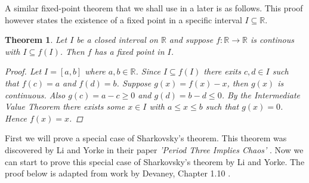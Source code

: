 \documentclass[11pt,a4paper,oneside]{memoir}
\theoremstyle{plain}
\newtheorem{thm}{Theorem}[chapter]
\theoremstyle{definition}
\begin{document}
A similar fixed-point theorem that we shall use in a later is as follows. This proof however states the existence of a fixed point in a specific interval $I \subseteq \mathbb{R}$.

\begin{thm} \label{thm:interval-fixed-points}
    Let $I$ be a closed interval on $\mathbb{R}$ and suppose $f: \mathbb{R} \to \mathbb{R}$ is continous with $I \subseteq f(I)$. Then $f$ has a fixed point in $I$.
    \begin{proof}
        Let $I = [a, b]$ where $a, b \in \mathbb{R}$. Since $I \subseteq f(I)$ there exits $c, d \in I$ such that $f(c) = a$ and $f(d) = b$. Suppose $g(x) = f(x) - x$, then $g(x)$ is continuous. Also $g(c) = a - c \geq 0$ and $g(d) = b - d \leq 0$. By the Intermediate Value Theorem there exists some $x \in I$ with $a \leq x \leq b$ such that $g(x) = 0$. Hence $f(x) = x$.
    \end{proof}
\end{thm}

First we will prove a special case of Sharkovsky's theorem. This theorem was discovered by Li and Yorke in their paper \emph{'Period Three Implies Chaos'} \cite{li-yorke}. Now we can start to prove this special case of Sharkovsky's theorem by Li and Yorke. The proof below is adapted from work by Devaney, Chapter 1.10 \cite{devaney}.
\end{document}
